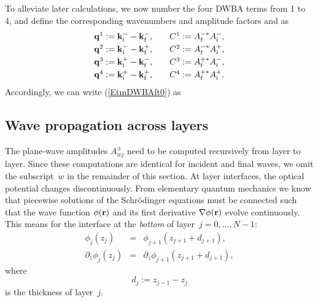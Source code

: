 To alleviate later calculations,
we now number the four DWBA terms from 1 to 4,
and define the corresponding wavenumbers and amplitude factors and as
\begin{equation}
  \begin{array}{l@{\hspace{2em}}l}
    \q^1 := \k^-_\ti - \k^-_\tf,& C^1 := A^{-*}_\tf A^-_\ti, \\[.6ex]
    \q^2 := \k^-_\ti - \k^+_\tf,& C^2 := A^{-*}_\tf A^+_\ti, \\[.6ex]
    \q^3 := \k^+_\ti - \k^-_\tf,& C^3 := A^{+*}_\tf A^-_\ti, \\[.6ex]
    \q^4 := \k^+_\ti - \k^+_\tf,& C^4 := A^{+*}_\tf A^+_\ti.
  \end{array}
\end{equation}
Accordingly, we can write (\ref{EtmDWBAft0}) as

\subsection{Wave propagation across layers}\label{Sacrolay}

%
%
%

The plane-wave amplitudes $A^\pm_{wj}$ need to be computed recursively
from layer to layer.
Since these computations are identical for incident and final waves,
we omit the subscript~$w$ in the remainder of this section.
At layer interfaces, the optical potential changes discontinuously.
From elementary quantum mechanics we know that
piecewise solutions of the Schrödinger equations must be connected
such that the wave function $\phi(\mathbf{r})$ and its first derivative
$\mathbf{\nabla}\phi(\mathbf{r})$ evolve continuously.
This means for the interface
at the \textit{bottom} of layer~$j=0,\ldots,N-1$:%
\begin{equation}\label{Econtcond}
  \begin{array}{lcl}
            \phi_j(z_j)&=&\phi_{j+1}(z_{j+1}+d_{j+1}),\\
            \partial_z\phi_j(z_j)&=&\partial_z\phi_{j+1}(z_{j+1}+d_{j+1}),
  \end{array}
\end{equation}
  where
\begin{equation}
  d_j:=z_{j-1}-z_{j}
\end{equation}
is the thickness of layer~$j$.

